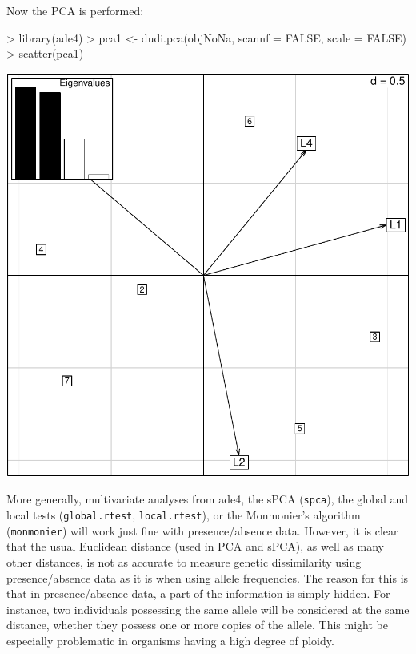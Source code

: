 \documentclass{article}
\begin{document}
\noindent Now the PCA is performed:
\begin{Schunk}
\begin{Sinput}
> library(ade4)
> pca1 <- dudi.pca(objNoNa, scannf = FALSE, scale = FALSE)
> scatter(pca1)
\end{Sinput}
\end{Schunk}
\includegraphics{figs/base-pcaaflp}

\noindent More generally, multivariate analyses from ade4, the sPCA (\texttt{spca}), the
global and local tests (\texttt{global.rtest}, \texttt{local.rtest}), or
the Monmonier's algorithm (\texttt{monmonier}) will work just fine
with presence/absence data.
However, it is clear that the usual Euclidean distance (used in PCA
and sPCA), as well as many other distances, is not as accurate to measure genetic dissimilarity using
presence/absence data as it is when using allele frequencies.
The reason for this is that in presence/absence data, a part of the
information is simply hidden.
For instance, two individuals possessing the same allele will be
considered at the same distance, whether they possess one or more
copies of the allele.
This might be especially problematic in organisms having a high degree
of ploidy.





\end{document}
